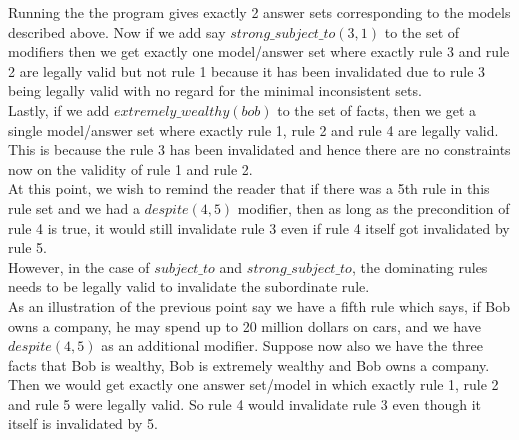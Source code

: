 Running the the program gives exactly 2 answer sets corresponding to the models described above. Now if we add say $strong\_subject\_to(3,1)$ to the set of modifiers then we get exactly one model/answer set where exactly rule 3 and rule 2 are legally valid but not rule 1 because it has been invalidated due to rule 3 being legally valid with no regard for the minimal inconsistent sets.\\
\newline
Lastly, if we add $extremely\_wealthy(bob)$ to the set of facts, then we get a single model/answer set where exactly rule 1, rule 2 and rule 4 are legally valid. This is because the rule 3 has been invalidated and hence there are no constraints now on the validity of rule 1 and rule 2.\\
\newline
At this point, we wish to remind the reader that if there was a 5th rule in this rule set and we had a $despite(4,5)$ modifier, then as long as the precondition of rule 4 is true, it would still invalidate rule 3 even if rule 4 itself got invalidated by rule 5.\\
\newline
However, in the case of $subject\_to$ and $strong\_subject\_to$, the dominating rules needs to be legally valid to invalidate the subordinate rule.\\ 
\newline
As an illustration of the previous point say we have a fifth rule which says, if Bob owns a company, he may spend up to 20 million dollars on cars, and we have $despite(4,5)$ as an additional modifier. Suppose now also we have the three facts that Bob is wealthy, Bob is extremely wealthy and Bob owns a company. Then we would get exactly one answer set/model in which exactly rule 1, rule 2 and rule 5 were legally valid. So rule 4 would invalidate rule 3 even though it itself is invalidated by 5. 
